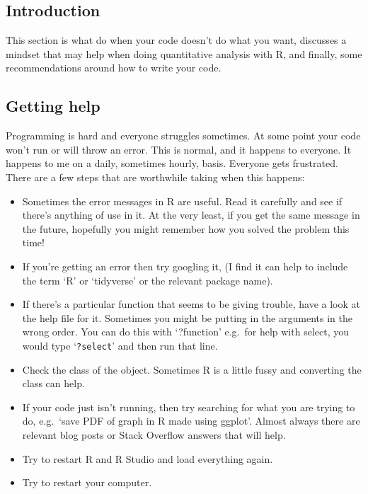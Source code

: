 \documentclass[
]{book}
\providecommand{\tightlist}{%
  \setlength{\itemsep}{0pt}\setlength{\parskip}{0pt}}
\begin{document}
\hypertarget{introduction-3}{%
\subsection{Introduction}\label{introduction-3}}

This section is what do when your code doesn't do what you want, discusses a mindset that may help when doing quantitative analysis with R, and finally, some recommendations around how to write your code.

\hypertarget{getting-help}{%
\subsection{Getting help}\label{getting-help}}

Programming is hard and everyone struggles sometimes. At some point your code won't run or will throw an error. This is normal, and it happens to everyone. It happens to me on a daily, sometimes hourly, basis. Everyone gets frustrated. There are a few steps that are worthwhile taking when this happens:

\begin{itemize}
\tightlist
\item
  Sometimes the error messages in R are useful. Read it carefully and see if there's anything of use in it. At the very least, if you get the same message in the future, hopefully you might remember how you solved the problem this time!
\item
  If you're getting an error then try googling it, (I find it can help to include the term `R' or `tidyverse' or the relevant package name).
\item
  If there's a particular function that seems to be giving trouble, have a look at the help file for it. Sometimes you might be putting in the arguments in the wrong order. You can do this with `?function' e.g.~for help with select, you would type `\texttt{?select}' and then run that line.
\item
  Check the class of the object. Sometimes R is a little fussy and converting the class can help.
\item
  If your code just isn't running, then try searching for what you are trying to do, e.g.~`save PDF of graph in R made using ggplot'. Almost always there are relevant blog posts or Stack Overflow answers that will help.
\item
  Try to restart R and R Studio and load everything again.
\item
  Try to restart your computer.
\end{itemize}
\end{document}
